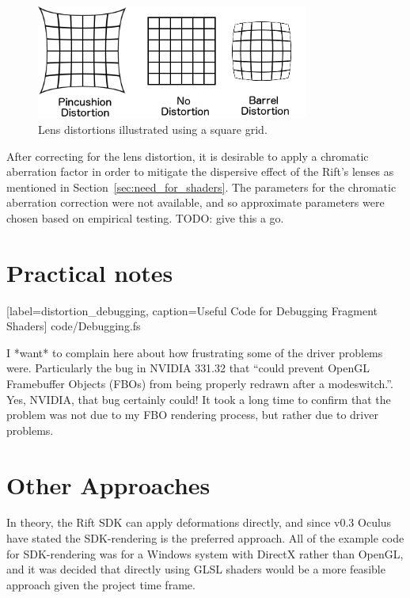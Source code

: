 \documentclass[MSc,paper=a4,pagesize=auto]{icldt}
\begin{document}
\begin{figure}[htbp!]
    \centering
    \includegraphics[width=0.8\textwidth]{resources/distortions}
    \caption{Lens distortions illustrated using a square grid.}
    \label{fig:distortions}
\end{figure}

After correcting for the lens distortion, it is desirable to apply a chromatic aberration factor in order to mitigate the dispersive effect of the Rift's lenses as mentioned in Section~\ref{sec:need_for_shaders}. The parameters for the chromatic aberration correction were not available, and so approximate parameters were chosen based on empirical testing. TODO: give this a go. 

\section{Practical notes}


  [label=distortion_debugging, caption=Useful Code for Debugging Fragment Shaders]
  {code/Debugging.fs}
  
I *want* to complain here about how frustrating some of the driver problems were. Particularly the bug in NVIDIA 331.32 that ``could prevent OpenGL Framebuffer Objects (FBOs) from being properly redrawn after a modeswitch.''. Yes, NVIDIA, that bug certainly could! It took a long time to confirm that the problem was not due to my FBO rendering process, but rather due to driver problems.


\section{Other Approaches}
In theory, the Rift SDK can apply deformations directly, and since v0.3 Oculus have stated the SDK-rendering is the preferred approach. All of the example code for SDK-rendering was for a Windows system with DirectX rather than OpenGL, and it was decided that directly using GLSL shaders would be a more feasible approach given the project time frame. 
\end{document}
